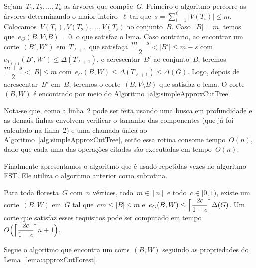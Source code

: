 	Sejam~${T_1, T_2, \ldots,T_k}$ as árvores que compõe~$G$. 
	Primeiro o algoritmo percorre as árvores determinando
	o maior inteiro~$\ell$ tal 
	que~${s=\displaystyle\sum_{i=1}^{\ell}|V(T_i)| \le m}$.
	Colocamos~${V(T_1),V(T_2), \ldots,V(T_\ell)}$ no conjunto~$B$.
	Caso~${|B|=m}$, temos que~${e_G(B,V\setminus B)=0}$, o que 
	satisfaz o lema.
	Caso contrário, ao encontrar um corte~$(B',W')$ em~$T_{\ell+1}$
	que satisfaça~${\dfrac{m-s}{2}<|B'|\le m-s}$ 
	com~${e_{T_{\ell+1}}(B',W') \le \Delta(T_{\ell+1})}$, e 
	acrescentar~$B'$ ao conjunto~$B$, 
	teremos~${\dfrac{m+s}{2}<|B| \le m}$ 
	com~${e_G(B,W)\le\Delta(T_{\ell+1}) \le \Delta(G)}$.
	Logo, depois de acrescentar~$B'$ em~$B$, teremos o 
	corte~${(B,V\setminus B)}$ que satisfaz o lema.
	O corte~$(B,W)$ é encontrado por meio do 
	Algoritmo~\ref{alg:simpleApproxCutTree}.

	
	Nota-se que, como a linha~2 pode ser feita usando uma busca em 
	profundidade e as demais linhas envolvem verificar o tamanho 
	das componentes (que já foi calculado na linha~2) e uma 
	chamada única ao Algoritmo~\ref{alg:simpleApproxCutTree}, então 
	essa rotina consome tempo~$O(n)$, dado que cada uma 
	das operações citadas são executadas em tempo~$O(n)$. 

\bigskip
\bigskip
\bigskip



Finalmente apresentamos o algoritmo que é usado repetidas 
vezes no algoritmo FST.
Ele utiliza o algoritmo anterior como subrotina.

\begin{lem}
\label{lema:approxCutForest}
	Para toda floresta~$G$ com~$n$ vértices, todo~${m \in [n]}$ e 
	todo~${c \in [0,1)}$, existe um corte~$(B,W)$ em~$G$ tal 
	que~${cm \le |B| \le m}$ 
	e~${e_G(B,W) \le \ceil[\Big]{ \dfrac{2c}{1-c}} \Delta(G)}$.
	Um corte que satisfaz esses requisitos pode ser computado em
	tempo~${O\Big(\ceil[\Big]{ \dfrac{2c}{1-c}} n+1\Big)}$.
\end{lem}


Segue o algoritmo que encontra um corte~$(B,W)$ seguindo
as propriedades do Lema~\ref{lema:approxCutForest}.

